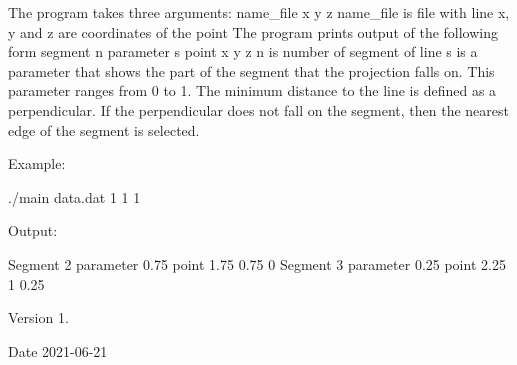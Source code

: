 The program takes three arguments\+: name\+\_\+file x y z name\+\_\+file is file with line x, y and z are coordinates of the point The program prints output of the following form segment n parameter s point x y z n is number of segment of line s is a parameter that shows the part of the segment that the projection falls on. This parameter ranges from 0 to 1. The minimum distance to the line is defined as a perpendicular. If the perpendicular does not fall on the segment, then the nearest edge of the segment is selected.

Example\+: \begin{DoxyVerb}./main data.dat 1 1 1 
\end{DoxyVerb}
 Output\+: \begin{DoxyVerb}Segment 2 parameter 0.75 point 1.75 0.75 0
Segment 3 parameter 0.25 point 2.25 1 0.25
\end{DoxyVerb}
 \begin{DoxyVersion}{Version}
1. 
\end{DoxyVersion}
\begin{DoxyDate}{Date}
2021-\/06-\/21 
\end{DoxyDate}
